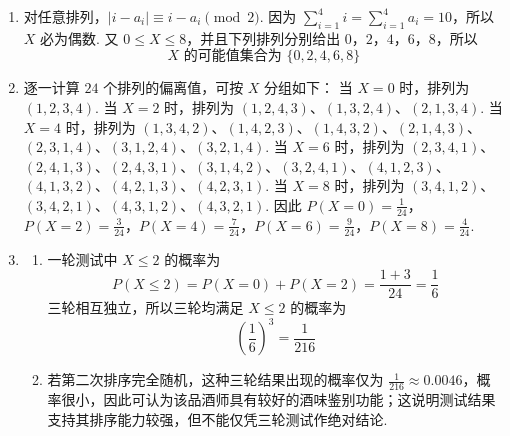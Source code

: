 \begin{solution}
\begin{enumerate}
\item 对任意排列，\(|i-a_i|\equiv i-a_i\pmod 2\). 因为 \(\sum_{i=1}^{4}i=\sum_{i=1}^{4}a_i=10\)，所以 \(X\) 必为偶数. 又 \(0\leqslant X\leqslant8\)，并且下列排列分别给出 \(0\)，\(2\)，\(4\)，\(6\)，\(8\)，所以
\[
X\text{ 的可能值集合为 }\{0,2,4,6,8\}
\]
\item 逐一计算 \(24\) 个排列的偏离值，可按 \(X\) 分组如下：
当 \(X=0\) 时，排列为 \((1,2,3,4)\).
当 \(X=2\) 时，排列为 \((1,2,4,3)\)、\((1,3,2,4)\)、\((2,1,3,4)\).
当 \(X=4\) 时，排列为 \((1,3,4,2)\)、\((1,4,2,3)\)、\((1,4,3,2)\)、\((2,1,4,3)\)、\((2,3,1,4)\)、\((3,1,2,4)\)、\((3,2,1,4)\).
当 \(X=6\) 时，排列为 \((2,3,4,1)\)、\((2,4,1,3)\)、\((2,4,3,1)\)、\((3,1,4,2)\)、\((3,2,4,1)\)、\((4,1,2,3)\)、\((4,1,3,2)\)、\((4,2,1,3)\)、\((4,2,3,1)\).
当 \(X=8\) 时，排列为 \((3,4,1,2)\)、\((3,4,2,1)\)、\((4,3,1,2)\)、\((4,3,2,1)\).
因此
\(P(X=0)=\frac{1}{24}\)，\(P(X=2)=\frac{3}{24}\)，\(P(X=4)=\frac{7}{24}\)，\(P(X=6)=\frac{9}{24}\)，\(P(X=8)=\frac{4}{24}\).
\item
\begin{enumerate}
\item 一轮测试中 \(X\leqslant2\) 的概率为
\[
P(X\leqslant2)=P(X=0)+P(X=2)=\frac{1+3}{24}=\frac{1}{6}
\]
三轮相互独立，所以三轮均满足 \(X\leqslant2\) 的概率为
\[
\left(\frac{1}{6}\right)^3=\frac{1}{216}
\]
\item 若第二次排序完全随机，这种三轮结果出现的概率仅为 \(\frac{1}{216}\approx0.0046\)，概率很小，因此可认为该品酒师具有较好的酒味鉴别功能；这说明测试结果支持其排序能力较强，但不能仅凭三轮测试作绝对结论.
\end{enumerate}
\end{enumerate}
\end{solution}
